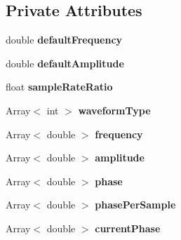\subsection*{Private Attributes}
\begin{DoxyCompactItemize}
\item 
\hypertarget{classSignalGenerator_a99f2b86b186147180c176586cbd217cd}{double {\bfseries default\-Frequency}}\label{classSignalGenerator_a99f2b86b186147180c176586cbd217cd}

\item 
\hypertarget{classSignalGenerator_adb7437b20ad94c87a8c6e8ca7f7f1e17}{double {\bfseries default\-Amplitude}}\label{classSignalGenerator_adb7437b20ad94c87a8c6e8ca7f7f1e17}

\item 
\hypertarget{classSignalGenerator_ab689b0db43d2cca457ad2b4f5cc06e62}{float {\bfseries sample\-Rate\-Ratio}}\label{classSignalGenerator_ab689b0db43d2cca457ad2b4f5cc06e62}

\item 
\hypertarget{classSignalGenerator_aea1e4c686d397deb8d9b9dc531fbac43}{Array$<$ int $>$ {\bfseries waveform\-Type}}\label{classSignalGenerator_aea1e4c686d397deb8d9b9dc531fbac43}

\item 
\hypertarget{classSignalGenerator_a47382f5d907635faf8303acb3eaca095}{Array$<$ double $>$ {\bfseries frequency}}\label{classSignalGenerator_a47382f5d907635faf8303acb3eaca095}

\item 
\hypertarget{classSignalGenerator_a9254969b56415ed531b98d4a1b9b956d}{Array$<$ double $>$ {\bfseries amplitude}}\label{classSignalGenerator_a9254969b56415ed531b98d4a1b9b956d}

\item 
\hypertarget{classSignalGenerator_ab9e8d7d1917c680a5a096a1cb9c20bb5}{Array$<$ double $>$ {\bfseries phase}}\label{classSignalGenerator_ab9e8d7d1917c680a5a096a1cb9c20bb5}

\item 
\hypertarget{classSignalGenerator_a288b97f9277a0961d43e9c126ea41b39}{Array$<$ double $>$ {\bfseries phase\-Per\-Sample}}\label{classSignalGenerator_a288b97f9277a0961d43e9c126ea41b39}

\item 
\hypertarget{classSignalGenerator_a70e172f8dd38cee5f73564c013bf93b6}{Array$<$ double $>$ {\bfseries current\-Phase}}\label{classSignalGenerator_a70e172f8dd38cee5f73564c013bf93b6}

\end{DoxyCompactItemize}
